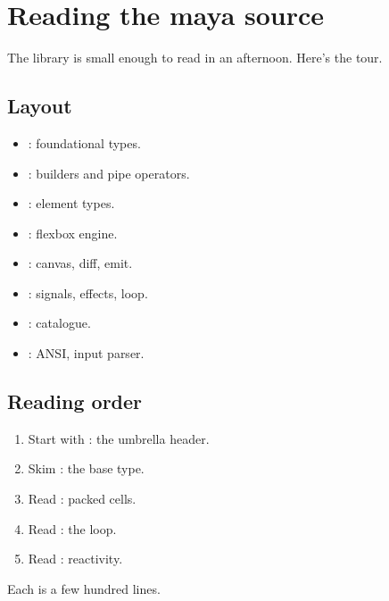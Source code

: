 \chapter{Reading the maya source}
\label{ch:readingsource}

\begin{aside}
The library is small enough to read in an afternoon. Here's
the tour.
\end{aside}

\section{Layout}

\begin{itemize}[leftmargin=*]
  \item {}: foundational types.
  \item {}: builders and pipe
    operators.
  \item {}: element types.
  \item {}: flexbox engine.
  \item {}: canvas, diff,
    emit.
  \item {}: signals,
    effects, loop.
  \item {}: catalogue.
  \item {}: ANSI, input parser.
\end{itemize}

\section{Reading order}

\begin{enumerate}[leftmargin=*]
  \item Start with : the
    umbrella header.
  \item Skim : the base type.
  \item Read : packed cells.
  \item Read : the loop.
  \item Read : reactivity.
\end{enumerate}

Each is a few hundred lines.

